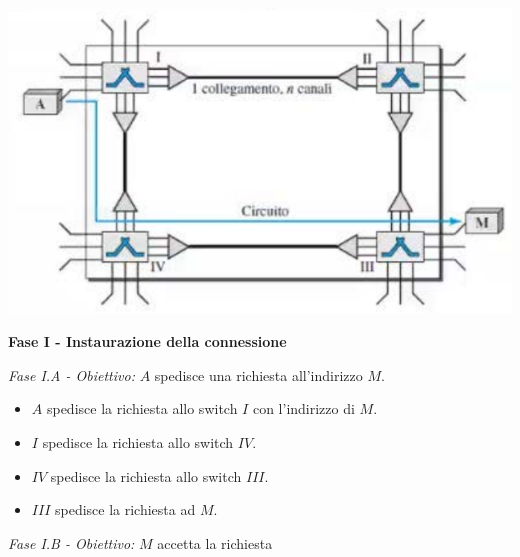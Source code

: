             \begin{center}
                \includegraphics[scale=0.75]{images/Circuito_Fase1.png}
            \end{center}
                
            \textbf{Fase I - Instaurazione della connessione}
                
            \vspace{3mm}
                
            \textit{Fase I.A - Obiettivo:} $A$ spedisce una richiesta all'indirizzo $M$.
                
            \begin{itemize}
            
                \item
                    $A$ spedisce la richiesta allo switch $I$ con l'indirizzo di $M$.
                    
                \item
                    $I$ spedisce la richiesta allo switch $IV$.
                    
                \item
                    $IV$ spedisce la richiesta allo switch $III$.
                    
                \item
                    $III$ spedisce la richiesta ad $M$.
                    
            \end{itemize}
            
            \textit{Fase I.B - Obiettivo:} $M$ accetta la richiesta
            
            \vspace{3mm}
            
